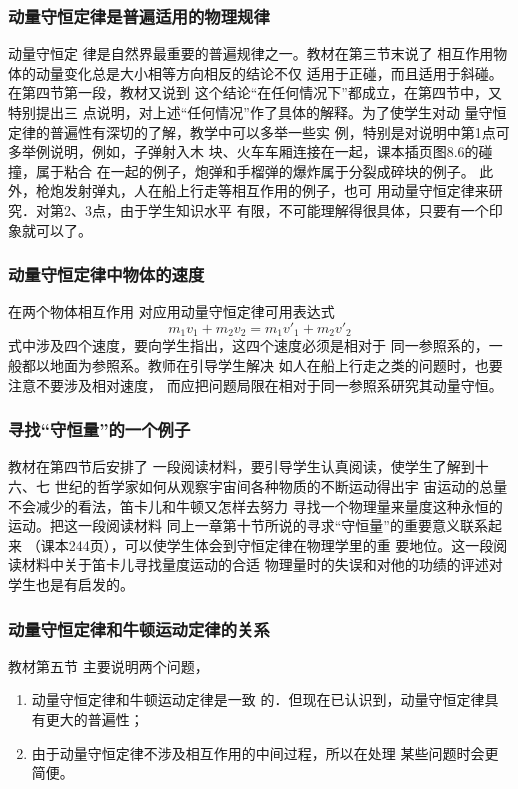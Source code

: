 \subsubsection{动量守恒定律是普遍适用的物理规律}

动量守恒定
律是自然界最重要的普遍规律之一。教材在第三节末说了
相互作用物体的动量变化总是大小相等方向相反的结论不仅
适用于正碰，而且适用于斜碰。在第四节第一段，教材又说到
这个结论“在任何情况下”都成立，在第四节中，又特别提出三
点说明，对上述“任何情况”作了具体的解释。为了使学生对动
量守恒定律的普遍性有深切的了解，教学中可以多举一些实
例，特别是对说明中第1点可多举例说明，例如，子弹射入木
块、火车车厢连接在一起，课本插页图8.6的碰撞，属于粘合
在一起的例子，炮弹和手榴弹的爆炸属于分裂成碎块的例子。
此外，枪炮发射弹丸，人在船上行走等相互作用的例子，也可
用动量守恒定律来研究．对第2、3点，由于学生知识水平
有限，不可能理解得很具体，只要有一个印象就可以了。

\subsubsection{动量守恒定律中物体的速度}

在两个物体相互作用
对应用动量守恒定律可用表达式
\[m_1v_1+m_2v_2=m_1v'_1+m_2v'_2\]
式中涉及四个速度，要向学生指出，这四个速度必须是相对于
同一参照系的，一般都以地面为参照系。教师在引导学生解决
如人在船上行走之类的问题时，也要注意不要涉及相对速度，
而应把问题局限在相对于同一参照系研究其动量守恒。

\subsubsection{寻找“守恒量”的一个例子}

教材在第四节后安排了
一段阅读材料，要引导学生认真阅读，使学生了解到十六、七
世纪的哲学家如何从观察宇宙间各种物质的不断运动得出宇
宙运动的总量不会减少的看法，笛卡儿和牛顿又怎样去努力
寻找一个物理量来量度这种永恒的运动。把这一段阅读材料
同上一章第十节所说的寻求“守恒量”的重要意义联系起来
（课本244页），可以使学生体会到守恒定律在物理学里的重
要地位。这一段阅读材料中关于笛卡儿寻找量度运动的合适
物理量时的失误和对他的功绩的评述对学生也是有启发的。

\subsubsection{动量守恒定律和牛顿运动定律的关系}

教材第五节
主要说明两个问题，
\begin{enumerate}
 \item 动量守恒定律和牛顿运动定律是一致
的．但现在已认识到，动量守恒定律具有更大的普遍性；
\item 由于动量守恒定律不涉及相互作用的中间过程，所以在处理
某些问题时会更简便。
\end{enumerate}

